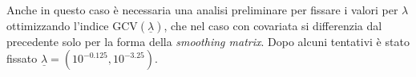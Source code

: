 \documentclass[a4paper,11pt,twoside,openright]{book}							%
\begin{document}
Anche in questo caso è necessaria una analisi preliminare per fissare i valori per $\lambda$ ottimizzando l'indice $\mathrm{GCV}(\underline \lambda)$, che nel caso con covariata si differenzia dal precedente solo per la forma della \textit{smoothing matrix}. Dopo alcuni tentativi è stato fissato $\underline \lambda = (10^{-0.125}, 10^{-3.25})$. 
\newpage
\begin{figure}[H]
\centering
{}
\end{figure}
\end{document}
